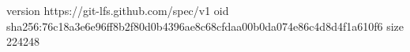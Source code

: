 version https://git-lfs.github.com/spec/v1
oid sha256:76c18a3e6e96ff8b2f80d0b4396ae8c68cfdaa00b0da074e86c4d8d4f1a610f6
size 224248
